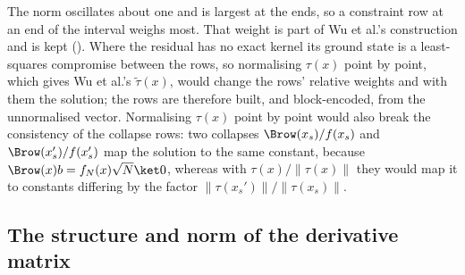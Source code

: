The norm oscillates about one and is largest at the ends, so a constraint row at an end of the interval weighs most. That weight is part of Wu et al.'s construction and is kept (). Where the residual has no exact kernel its ground state is a least-squares compromise between the rows, so normalising $\tau(x)$ point by point, which gives Wu et al.'s $\tilde\tau(x)$, would change the rows' relative weights and with them the solution; the rows are therefore built, and block-encoded, from the unnormalised vector. Normalising $\tau(x)$ point by point would also break the consistency of the collapse rows: two collapses $\Brow(x_s)/f(x_s)$ and $\Brow(x_s')/f(x_s')$ map the solution to the same constant, because $\Brow(x)b=f_N(x)\sqrt N\ket0$, whereas with $\tau(x)/\|\tau(x)\|$ they would map it to constants differing by the factor $\|\tau(x_s')\|/\|\tau(x_s)\|$.

\subsection{The structure and norm of the derivative matrix}
\label{app:cheb-G-norm}


